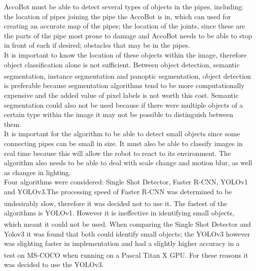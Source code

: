 \documentclass[11pt]{article}		%
\newcommand{\supercite}[1]{\textsuperscript{\cite{#1}}}		%
\begin{document}
	    AccoBot must be able to detect several types of objects in the pipes, including: the location of pipes joining the pipe the AccoBot is in, which can used for creating an accurate map of the pipes; the location of the joints, since these are the parts of the pipe most prone to damage and AccoBot needs to be able to stop in front of each if desired; obstacles that may be in the pipes.
	    \\
        \hspace*{3ex}It is important to know the location of these objects within the image, therefore object classification alone is not sufficient. Between object detection, semantic segmentation, instance segmentation and panoptic segmentation\supercite{segmentation}, object detection is preferable because segmentation algorithms tend to be more computationally expensive and the added value of pixel labels is not worth this cost. Semantic segmentation could also not be used because if there were multiple objects of a certain type within the image it may not be possible to distinguish between them.
        \\
        \hspace*{3ex}It is important for the algorithm to be able to detect small objects since some connecting pipes can be small in size. It must also be able to classify images in real time because this will allow the robot to react to its environment. The algorithm also needs to be able to deal with scale change and motion blur, as well as changes in lighting.
        \\
        \hspace*{3ex}Four algorithms were considered: Single Shot Detector, Faster R-CNN, YOLOv1 and YOLOv3.The processing speed of Faster R-CNN was determined to be undesirably slow, therefore it was decided not to use it.\supercite{YOLO} The fastest of the algorithms is YOLOv1. However it is ineffective in identifying small objects, which meant it could not be used.\supercite{YOLO} When comparing the Single Shot Detector and Yolov3 it was found that both could identify small objects; the YOLOv3 however was slighting faster in implementation and had a slightly higher accuracy in a test on MS-COCO when running on a Pascal Titan X GPU.\supercite{YOLO} For these reasons it was decided to use the YOLOv3.
        \\
\end{document}
